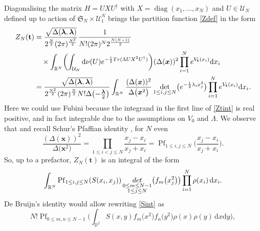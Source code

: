 \documentclass[11pt]{article}
\numberwithin{equation}{section}
\numberwithin{equation}{section}
\newcommand{\dd}{\mathrm{d}}
\begin{document}
Diagonalising the matrix $H = UXU^{\dagger}$ with $X = \operatorname{diag}(x_1,\dots,x_N)$ and $U \in \mathcal{U}_N$ defined up to action of $\mathfrak{S}_N \times \mathcal{U}_1^{N}$ brings the partition function \eqref{Zdef} in the form
\begin{align}
Z_N(\mathbf{t}) & = \frac{\sqrt{\Delta(\boldsymbol{\lambda},\boldsymbol{\lambda})}}{2^{\frac{N}{2}} (2\pi)^{\frac{N^2}{2}}} \frac{1}{N! (2\pi)^N 2^{\frac{N(N - 1)}{2}}} \nonumber\\
&\quad{}\times \int_{\mathbb{R}^N} \biggl(\int_{\mathcal{U}_N} \dd \nu(U) {\rm e}^{-\frac{1}{2}{\rm Tr}(\Lambda U X^2 U^{\dagger})}\biggr) (\Delta(\boldsymbol{x}))^2 \prod_{i = 1}^N {\rm e}^{V_{\mathbf{t}}(x_i)}\dd x_i \nonumber \\
& = \frac{\sqrt{\Delta(\boldsymbol{\lambda},\boldsymbol{\lambda})}}{2^{\frac{N^2}{2}} (2\pi)^{\frac{N}{2}} N! \Delta\bigl(-\frac{\boldsymbol{\lambda}}{2}\bigr)} \int_{\mathbb{R}^N} \frac{(\Delta(\boldsymbol{x}))^2}{\Delta\bigl(\boldsymbol{x}^2\bigr)} \mathop{\det}_{1 \leq i,j \leq N} \bigl({\rm e}^{-\frac{1}{2}\lambda_ix_j^2}\bigr) \prod_{i = 1}^N {\rm e}^{V_{\mathbf{t}}(x_i)} \dd x_i. \label{Ztint}
\end{align}
Here we could use Fubini because the integrand in the first line of \eqref{Ztint} is real positive, and in fact integrable due to the assumptions on $V_0$ and $\Lambda$. We observe that  and recall Schur's Pfaffian identity \cite{Schur1911}, for $N$ even
\[
\frac{(\Delta(\boldsymbol{x}))^2}{\Delta\bigl(\boldsymbol{x}^2\bigr)} = \prod_{1 \leq i < j \leq N} \frac{x_j - x_i}{x_j + x_i} = \operatorname{Pf}_{1 \leq i,j \leq N}\biggl(\frac{x_j - x_i}{x_j + x_i}\biggr).
\]
So, up to a prefactor, $Z_N(\mathbf{t})$ is an integral of the form
\begin{equation}
\label{Sint}
\int_{\mathbb{R}^N} \operatorname{Pf}_{1 \leq i,j \leq N} (S(x_i,x_j)) \mathop{{\rm det}}_{\substack{0 \leq m \leq N - 1 \\ 1 \leq j \leq N}} \bigl(f_m\bigl(x_j^2\bigr)\bigr) \prod_{i = 1}^N \rho(x_i)\,\dd x_i.
\end{equation}
De Bruijn's identity \cite{deBruijn1955} would allow rewriting \eqref{Sint} as
\begin{equation}
\label{dJ}
N! \operatorname{Pf}_{0 \leq m,n \leq N - 1}\biggl(\int_{\mathbb{R}^2} S(x,y) f_m\bigl(x^2\bigr)f_n\bigl(y^2\bigr)\rho(x)\rho(y)\,\dd x \dd y\biggr),
\end{equation}
\end{document}
